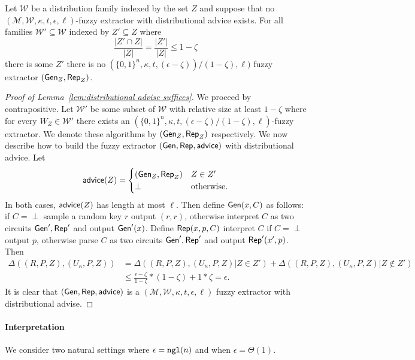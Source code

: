 \begin{lemma}

Let $\mathcal{W}$ be a distribution family indexed by the set $Z$ and suppose that no $(\mathcal{M}, \mathcal{W}, \kappa, t, \epsilon, \ell)$-fuzzy extractor with distributional advice exists.  For all families $\mathcal{W}'\subseteq \mathcal{W}$ indexed by $Z'\subseteq Z$ where \[\frac{|Z'\cap Z|}{|Z|} = \frac{|Z'|}{|Z|}\le 1-\zeta\] there is some $Z'$ there is no  $(\{0,1\}^n,\kappa, t, (\epsilon-\zeta))/(1-\zeta), \ell)$ fuzzy extractor $({\mathsf{Gen}}_Z, {\mathsf{Rep}}_Z)$.
\label{lem:distributional advise suffices}
\end{lemma}
\begin{proof}[Proof of Lemma~\ref{lem:distributional advise suffices}]
We proceed by contrapositive.  Let $\mathcal{W}'$ be some subset of $\mathcal{W}$ with relative size at least $1-\zeta$ where  for every $W_Z\in\mathcal{W}'$ there exists an $(\{0,1\}^n,\kappa, t, (\epsilon-\zeta)/(1-\zeta), \ell)$-fuzzy extractor.  We denote these algorithms by $({\mathsf{Gen}}_Z, {\mathsf{Rep}}_Z)$ respectively.  We now describe how to build the fuzzy extractor $({\mathsf{Gen}}, {\mathsf{Rep}}, {\mathsf{advice}})$ with distributional advice.  Let 
\[
{\mathsf{advice}}(Z) = \begin{cases} ({\mathsf{Gen}}_Z, {\mathsf{Rep}}_Z)& Z\in Z'\\\perp&\text{otherwise.}\end{cases}
\]
In both cases, ${\mathsf{advice}}(Z)$ has length at most $\ell$. Then define ${\mathsf{Gen}}(x, C)$ as follows:  if $C = \perp$ sample a random key $r$ output $(r, r)$, otherwise interpret $C$ as two circuits ${\mathsf{Gen}}', {\mathsf{Rep}}'$ and output ${\mathsf{Gen}}'(x)$.  Define ${\mathsf{Rep}}(x, p, C)$ interpret $C$ if $C = \perp$ output $p$, otherwise parse $C$ as two circuits ${\mathsf{Gen}}', {\mathsf{Rep}}'$ and output ${\mathsf{Rep}}'(x', p)$.  
Then 
\begin{align*}
\Delta((R, P, Z), (U_\kappa, P, Z)) &= \Delta((R, P, Z), (U_\kappa, P, Z) | Z\in Z')+\Delta((R, P, Z), (U_\kappa, P, Z) | Z\not\in Z')\\
&\le \frac{\epsilon-\zeta}{1-\zeta} * (1-\zeta) + 1* \zeta = \epsilon.
\end{align*}
It is clear that $({\mathsf{Gen}}, {\mathsf{Rep}}, {\mathsf{advice}})$ is a $(\mathcal{M}, \mathcal{W}, \kappa, t, \epsilon, \ell)$ fuzzy extractor with distributional advise.
\end{proof}

\paragraph{Interpretation} 
We consider two natural settings where $\epsilon = \mathtt{ngl}(n)$ and when $\epsilon = \Theta(1)$.

